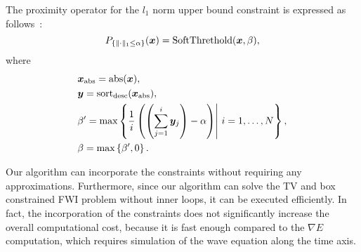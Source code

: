 The proximity operator for the $l_1$ norm upper bound constraint is expressed as follows~\cite{L1-ball-projection}:
\begin{equation} \label{eq:ProximityOperatorForL1Ball}  \projLOneBallSolution, \end{equation}
where
\begin{equation}
    \label{eq:ProximityOperatorForL1BallWhere}
    \begin{aligned}[b]
        & \bm x_{\text{abs}} = \text{abs}(\vecx), \\
        & \bm y              = \text{sort}_{\text{desc}}(\vecx_{\text{abs}}), \\
        & \beta'             = \text{max} \left\{ \frac 1 i \left(\left(\sum_{j=1}^i \bm y_j\right) - \alpha\right) \middle| \ i = 1, \ldots, N \right\}, \\
        & \beta              = \text{max} \left\{ \beta', 0 \right\}. \\
    \end{aligned}
\end{equation}

Our algorithm can incorporate the constraints without requiring any approximations.
Furthermore, since our algorithm can solve the TV and box constrained FWI problem without inner loops, it can be executed efficiently.
In fact, the incorporation of the constraints does not significantly increase the overall computational cost, because it is fast enough compared to the $\nabla E$ computation, which requires simulation of the wave equation along the time axis.
